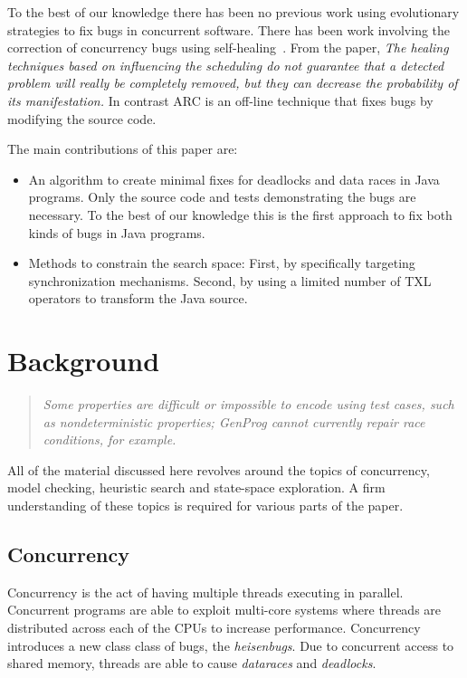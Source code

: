 \documentclass[10pt, conference, compsocconf]{IEEEtran}
\begin{document}
To the best of our knowledge there has been no previous work using evolutionary
strategies to fix bugs in concurrent software.  There has been work involving
the correction of concurrency bugs using self-healing~\cite{LVK08}. From the
paper, \textit{The healing techniques based on influencing the scheduling do
not guarantee that a detected problem will really be completely removed, but
they can decrease the probability of its manifestation.} In contrast ARC is an
off-line technique that fixes bugs by modifying the source code.

The main contributions of this paper are:

\begin{itemize}

\item An algorithm to create minimal fixes for deadlocks and data races in Java
programs. Only the source code and tests demonstrating the bugs are necessary.
To the best of our knowledge this is the first approach to fix both kinds of
bugs in Java programs.

\item Methods to constrain the search space: First, by specifically targeting
synchronization mechanisms. Second, by using a limited number of TXL operators
to transform the Java source.

\end{itemize}

\section{Background}
\label{sec:background}

\begin{quote}\textit{Some properties are difficult or impossible to encode
using test cases, such as nondeterministic properties; GenProg cannot
currently repair race conditions, for example.}~\cite{GNFW11}
\end{quote}

All of the material discussed here revolves around the topics of concurrency,
model checking, heuristic search and state-space exploration. A firm
understanding of these topics is required for various parts of the paper.

\subsection{Concurrency}
\label{sec:concurrency}

Concurrency is the act of having multiple threads executing in parallel.
Concurrent programs are able to exploit multi-core systems where threads are distributed across each of the CPUs to increase performance. Concurrency
introduces a new class class of bugs, the \textit{heisenbugs}.  Due to 
concurrent access to shared memory, threads are able to cause 
\textit{dataraces} and \textit{deadlocks}.
\end{document}
